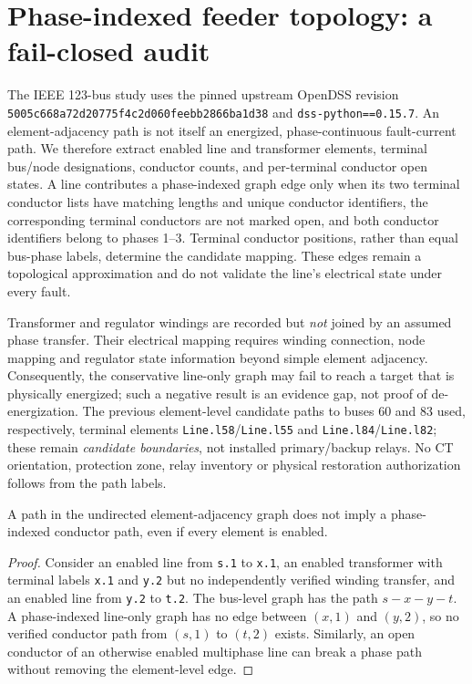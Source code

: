 \section{Phase-indexed feeder topology: a fail-closed audit}
\label{sec:p14-phase}
The IEEE 123-bus study uses the pinned upstream OpenDSS revision \texttt{5005c668a72d20775f4c2d060feebb2866ba1d38} and \texttt{dss-python==0.15.7}. An element-adjacency path is not itself an energized, phase-continuous fault-current path. We therefore extract enabled line and transformer elements, terminal bus/node designations, conductor counts, and per-terminal conductor open states. A line contributes a phase-indexed graph edge only when its two terminal conductor lists have matching lengths and unique conductor identifiers, the corresponding terminal conductors are not marked open, and both conductor identifiers belong to phases 1--3. Terminal conductor positions, rather than equal bus-phase labels, determine the candidate mapping. These edges remain a topological approximation and do not validate the line's electrical state under every fault.

Transformer and regulator windings are recorded but \emph{not} joined by an assumed phase transfer. Their electrical mapping requires winding connection, node mapping and regulator state information beyond simple element adjacency. Consequently, the conservative line-only graph may fail to reach a target that is physically energized; such a negative result is an evidence gap, not proof of de-energization. The previous element-level candidate paths to buses 60 and 83 used, respectively, terminal elements \texttt{Line.l58}/\texttt{Line.l55} and \texttt{Line.l84}/\texttt{Line.l82}; these remain \emph{candidate boundaries}, not installed primary/backup relays. No CT orientation, protection zone, relay inventory or physical restoration authorization follows from the path labels.

\begin{proposition}
A path in the undirected element-adjacency graph does not imply a phase-indexed conductor path, even if every element is enabled.
\end{proposition}
\begin{proof}
Consider an enabled line from \texttt{s.1} to \texttt{x.1}, an enabled transformer with terminal labels \texttt{x.1} and \texttt{y.2} but no independently verified winding transfer, and an enabled line from \texttt{y.2} to \texttt{t.2}. The bus-level graph has the path \(s-x-y-t\). A phase-indexed line-only graph has no edge between \((x,1)\) and \((y,2)\), so no verified conductor path from \((s,1)\) to \((t,2)\) exists. Similarly, an open conductor of an otherwise enabled multiphase line can break a phase path without removing the element-level edge.
\end{proof}

